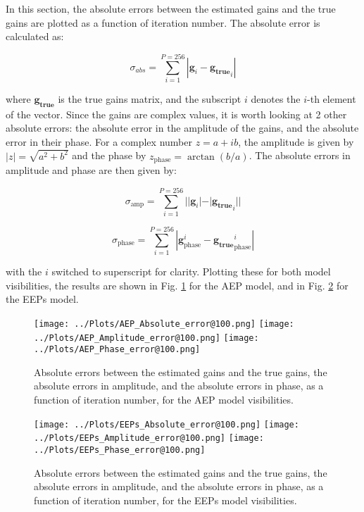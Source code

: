 \documentclass[12pt]{report} %
\begin{document}
In this section, the absolute errors between the estimated gains and the true gains are plotted as a function of iteration number. The absolute error is calculated as:

\begin{equation}
    \sigma_{abs} = \sum_{i = 1}^{P = 256}|\mathbf{g}_{i} - \mathbf{g_{\text{true}}}_{i}|
\end{equation}

where $\mathbf{g_{\text{true}}}$ is the true gains matrix, and the subscript $i$ denotes the $i$-th element of the vector. Since the gains are complex values, it is worth looking at 2 other absolute errors: the absolute error in the amplitude of the gains, and the absolute error in their phase. For a complex number $z = a + ib$, the amplitude is given by $|z| = \sqrt{a^{2} + b^{2}}$ and the phase by $z_{\text{phase}} = \arctan(b/a)$. The absolute errors in amplitude and phase are then given by:

\begin{equation}
    \sigma_{\text{amp}} = \sum_{i = 1}^{P = 256}||\mathbf{g}_{i}| - |\mathbf{g_{\text{true}}}_{i}||
\end{equation}

\begin{equation}
    \sigma_{\text{phase}} = \sum_{i = 1}^{P = 256}|\mathbf{g}^{i}_{\text{phase}} - \mathbf{g_{\text{true}}}^{i}_{\text{phase}}|
\end{equation}

with the $i$ switched to superscript for clarity. Plotting these for both model visibilities, the results are shown in Fig. \ref{fig:abs_error_AEP} for the AEP model, and in Fig. \ref{fig:abs_error_EEP} for the EEPs model.

\begin{figure}[h]
    \centering
    \texttt{[image: ../Plots/AEP\_Absolute\_error@100.png]}
    \texttt{[image: ../Plots/AEP\_Amplitude\_error@100.png]}
    \texttt{[image: ../Plots/AEP\_Phase\_error@100.png]}
    \caption{Absolute errors between the estimated gains and the true gains, the absolute errors in amplitude, and the absolute errors in phase, as a function of iteration number, for the AEP model visibilities.}
    \label{fig:abs_error_AEP}
\end{figure}

\begin{figure}[h]
  \centering
  \texttt{[image: ../Plots/EEPs\_Absolute\_error@100.png]}
  \texttt{[image: ../Plots/EEPs\_Amplitude\_error@100.png]}
  \texttt{[image: ../Plots/EEPs\_Phase\_error@100.png]}
  \caption{Absolute errors between the estimated gains and the true gains, the absolute errors in amplitude, and the absolute errors in phase, as a function of iteration number, for the EEPs model visibilities.}
  \label{fig:abs_error_EEP}
\end{figure}
\end{document}
